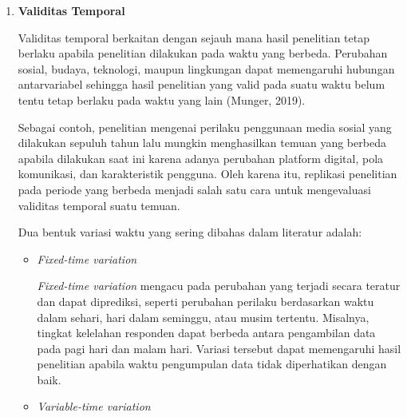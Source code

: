 \documentclass[
  indonesian,
  letterpaper,
  DIV=11,
  numbers=noendperiod]{scrreprt}
\begin{document}
\begin{enumerate}
\begin{itemize}
    \emph{Pretest sensitization} terjadi ketika pemberian pretest
    memengaruhi respons partisipan terhadap perlakuan atau pengukuran
    berikutnya. Dalam kondisi tersebut, hasil penelitian mungkin hanya
    berlaku bagi individu yang telah mengikuti pretest sehingga
    kemampuan generalisasinya menjadi terbatas (Shadish dkk., 2002).

    Sebagai contoh, pengisian kuesioner mengenai gaya hidup sehat
    sebelum mengikuti program edukasi dapat membuat peserta lebih
    memperhatikan perilaku kesehatannya. Akibatnya, perubahan yang
    terjadi setelah intervensi mungkin dipengaruhi oleh pretest, bukan
    hanya oleh program edukasi yang diberikan. Ancaman ini dapat
    dikurangi melalui penggunaan desain \emph{Solomon Four-Group Design}
    atau dengan mempertimbangkan kembali kebutuhan penggunaan pretest.
  \end{itemize}
\item
  \textbf{Validitas Temporal}

  Validitas temporal berkaitan dengan sejauh mana hasil penelitian tetap
  berlaku apabila penelitian dilakukan pada waktu yang berbeda.
  Perubahan sosial, budaya, teknologi, maupun lingkungan dapat
  memengaruhi hubungan antarvariabel sehingga hasil penelitian yang
  valid pada suatu waktu belum tentu tetap berlaku pada waktu yang lain
  (Munger, 2019).

  Sebagai contoh, penelitian mengenai perilaku penggunaan media sosial
  yang dilakukan sepuluh tahun lalu mungkin menghasilkan temuan yang
  berbeda apabila dilakukan saat ini karena adanya perubahan platform
  digital, pola komunikasi, dan karakteristik pengguna. Oleh karena itu,
  replikasi penelitian pada periode yang berbeda menjadi salah satu cara
  untuk mengevaluasi validitas temporal suatu temuan.

  Dua bentuk variasi waktu yang sering dibahas dalam literatur adalah:

  \begin{itemize}
  \item
    \emph{Fixed-time variation}

    \emph{Fixed-time variation} mengacu pada perubahan yang terjadi
    secara teratur dan dapat diprediksi, seperti perubahan perilaku
    berdasarkan waktu dalam sehari, hari dalam seminggu, atau musim
    tertentu. Misalnya, tingkat kelelahan responden dapat berbeda antara
    pengambilan data pada pagi hari dan malam hari. Variasi tersebut
    dapat memengaruhi hasil penelitian apabila waktu pengumpulan data
    tidak diperhatikan dengan baik.
  \item
    \emph{Variable-time variation}


\end{itemize}
\end{enumerate}
\end{document}
